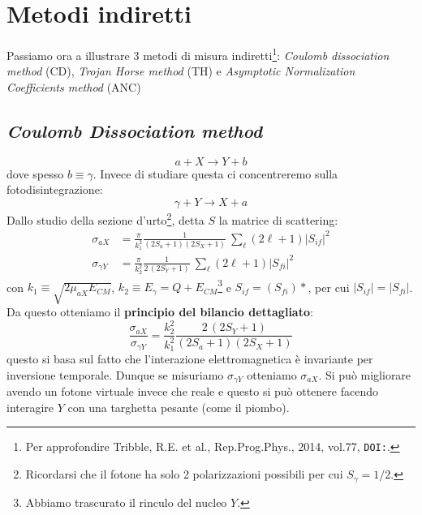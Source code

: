 \section{Metodi indiretti}
Passiamo ora a illustrare 3 metodi di misura indiretti\footnote{Per approfondire Tribble, R.E. et al., Rep.Prog.Phys., 2014, vol.77, \texttt{DOI:}.}: \textit{Coulomb dissociation method} (CD), \textit{Trojan Horse method} (TH) e \textit{Asymptotic Normalization Coefficients method} (ANC)

\subsection{\textit{Coulomb Dissociation method}}\label{sec-CD}
$$a+X \to Y+b$$
dove spesso $b\equiv \gamma$. Invece di studiare questa ci concentreremo sulla fotodisintegrazione:
$$\gamma + Y \to X+ a$$
Dallo studio della sezione d'urto\footnote{Ricordarsi che il fotone ha solo 2 polarizzazioni possibili per cui $S_\gamma=1/2$.}, detta $S$ la matrice di scattering:
\begin{align*} %
	\sigma_{aX} &= \frac{\pi}{k_1^2}\frac{1}{(2S_a+1)(2S_X+1)} \: \sum_\ell (2\ell+1) |S_{if}|^2 \\
	\sigma_{\gamma Y} &= \frac{\pi}{k_2^2}\frac{1}{2\,(2S_Y+1)} \: \sum_\ell (2\ell+1) |S_{fi}|^2 
\end{align*}
con $k_1\equiv\sqrt{2\mu_{aX}E_{CM}}$, $k_2\equiv E_\gamma = Q+E_{CM}$\footnote{Abbiamo trascurato il rinculo del nucleo $Y$.} e $S_{if} = (S_{fi})*$, per cui $|S_{if}|= |S_{fi}|$. Da questo otteniamo il \textbf{principio del bilancio dettagliato}:
$$\frac{\sigma_{aX}}{\sigma_{\gamma Y}} = \frac{k_2^2}{k_1^2} \frac{2\,(2S_Y+1)}{(2S_a+1)(2S_X+1)}$$
questo si basa sul fatto che l'interazione elettromagnetica è invariante per inversione temporale. Dunque se misuriamo $\sigma_{\gamma Y}$ otteniamo $\sigma_{aX}$. Si può migliorare avendo un fotone virtuale invece che reale e questo si può ottenere facendo interagire $Y$ con una targhetta pesante (come il piombo).

